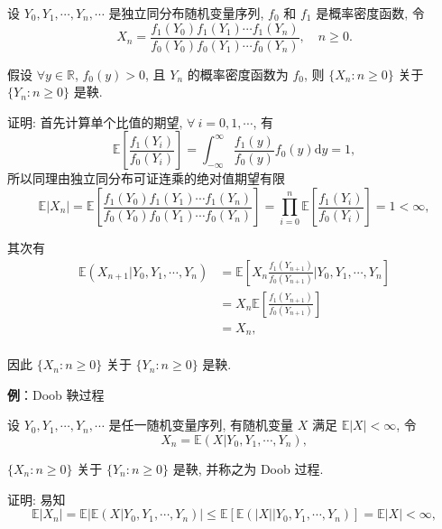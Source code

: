 \documentclass[openany]{ctexbook}
\theoremstyle{kaiti}
\theoremstyle{normal}
\begin{document}
设 $Y_0,Y_1,\cdots,Y_n,\cdots$ 是独立同分布随机变量序列, $f_0$ 和 $f_1$ 是概率密度函数, 令
\begin{equation}
  X_n=\frac{f_1(Y_0)f_1(Y_1)\cdots f_1(Y_n)}{f_0(Y_0)f_0(Y_1)\cdots f_0(Y_n)},\quad n\geqslant0.
\end{equation}

假设 $\forall y\in\mathbb{R}$, $f_0(y)>0$, 且 $Y_n$ 的概率密度函数为 $f_0$, 则 $\{X_n:n\geqslant0\}$ 关于 $\{Y_n:n\geqslant0\}$ 是鞅.

证明: 首先计算单个比值的期望, $\forall~i=0,1,\cdots$, 有
\begin{equation}
  \mathbb{E}\left[\frac{f_1(Y_{i})}{f_0(Y_{i})}\right]=\int_{-\infty}^\infty\frac{f_1(y)}{f_0(y)}f_0(y)\mathrm{d}y=1,
\end{equation}
所以同理由独立同分布可证连乘的绝对值期望有限
\begin{equation}
  \mathbb{E}|X_n|=\mathbb{E}\left[\frac{f_1(Y_0)f_1(Y_1)\cdots f_1(Y_n)}{f_0(Y_0)f_0(Y_1)\cdots f_0(Y_n)}\right]=\prod_{i=0}^n\mathbb{E}\left[\frac{f_1(Y_{i})}{f_0(Y_{i})}\right]=1<\infty,
\end{equation}

其次有
\begin{equation}
  \begin{aligned}
    \mathbb{E}(X_{n+1}|Y_0,Y_1,\cdots,Y_n)
    &=\mathbb{E}\left[X_n\frac{f_1(Y_{n+1})}{f_0(Y_{n+1})}|Y_0,Y_1,\cdots,Y_n\right]\\
    &=X_n\mathbb{E}\left[\frac{f_1(Y_{n+1})}{f_0(Y_{n+1})}\right]\\
    &=X_n,\\
  \end{aligned}
\end{equation}

因此 $\{X_n:n\geqslant0\}$ 关于 $\{Y_n:n\geqslant0\}$ 是鞅.

\textbf{例}：Doob 鞅过程

设 $Y_0,Y_1,\cdots,Y_n,\cdots$ 是任一随机变量序列, 有随机变量 $X$ 满足 $\mathbb{E}|X|<\infty$, 令
\begin{equation}
  X_n=\mathbb{E}(X|Y_0,Y_1,\cdots,Y_n),
\end{equation}

$\{X_n:n\geqslant0\}$ 关于 $\{Y_n:n\geqslant0\}$ 是鞅, 并称之为 Doob 过程.

证明: 易知
\begin{equation}
  \mathbb{E}|X_n|=\mathbb{E}|\mathbb{E}(X\big|Y_0,Y_1,\cdots,Y_n)|\leqslant \mathbb{E}[\mathbb{E}(|X|\big|Y_0,Y_1,\cdots,Y_n)]=\mathbb{E}|X|<\infty,
\end{equation}
\end{document}
